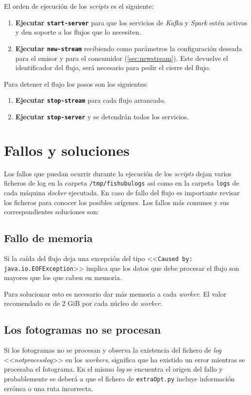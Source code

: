 El orden de ejecución de los \textit{scripts} es el siguiente:

\begin{enumerate}
	\item \textbf{Ejecutar \texttt{start-server}} para que los servicios de \textit{Kafka} y \textit{Spark} estén activos y den soporte a los flujos que lo necesiten.
	\item \textbf{Ejecutar \texttt{new-stream}} recibiendo como parámetros la configuración deseada para el emisor y para el consumidor (\autoref{sec:newstream}).  Este devuelve el identificador del flujo, será necesario para pedir el cierre del flujo.
\end{enumerate}

Para detener el flujo los pasos son los siguientes:
\begin{enumerate}
	\item \textbf{Ejecutar \texttt{stop-stream}} para cada flujo arrancado.
	\item \textbf{Ejecutar \texttt{stop-server}} y se detendrán todos los servicios.
\end{enumerate}

\section{Fallos y soluciones}

Los fallos que puedan ocurrir durante la ejecución de los \textit{scripts} dejan varios ficheros de log en la carpeta \texttt{/tmp/fishubulogs} así como en la carpeta \texttt{logs} de cada máquina \textit{docker} ejecutada. En caso de fallo del flujo es importante revisar los ficheros para conocer los posibles orígenes. Los fallos más comunes y sus correspondientes soluciones son:

\subsection{Fallo de memoria}
Si la caída del flujo deja una excepción del tipo <<\texttt{Caused by: java.io.EOFException}>> implica que los datos que debe procesar el flujo son mayores que los que caben en memoria.

Para solucionar esto es necesario dar más memoria a cada \textit{worker}. El valor recomendado es de 2 GiB por cada núcleo de \textit{worker}.

\subsection{Los fotogramas no se procesan}
Si los fotogramas no se procesan y observa la existencia del fichero de \textit{log} <<\textit{notprocesslog}>> en los \textit{workers}, significa que ha existido un error mientras se procesaba el fotograma. En el mismo \textit{log} se encuentra el origen del fallo y probablemente se deberá a que el fichero de \texttt{extraOpt.py} incluye información errónea o una ruta incorrecta.

